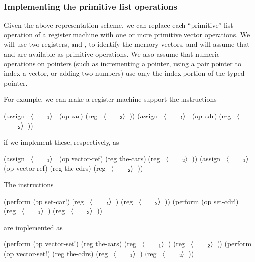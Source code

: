 \subsubsection*{Implementing the primitive list operations}

Given the above representation scheme, we can replace each ``primitive'' list
operation of a register machine with one or more primitive vector operations.
We will use two registers,  and , to identify the
memory vectors, and will assume that  and 
are available as primitive operations.  We also assume that numeric operations
on pointers (such as incrementing a pointer, using a pair pointer to index a
vector, or adding two numbers) use only the index portion of the typed pointer.

For example, we can make a register machine support the instructions

\begin{codeBlock}
(assign ~\(\langle \)~~~~\(_{\mono{1}}\rangle \)~ (op car) (reg ~\(\langle \)~~~~\(_{\mono{2}}\rangle \)~))
(assign ~\(\langle \)~~~~\(_{\mono{1}}\rangle \)~ (op cdr) (reg ~\(\langle \)~~~~\(_{\mono{2}}\rangle \)~))
\end{codeBlock}

\noindent
if we implement these, respectively, as

\begin{codeBlock}
(assign ~\(\langle \)~~~~\(_{\mono{1}}\rangle \)~
        (op vector-ref)
        (reg the-cars)
        (reg ~\(\langle \)~~~~\(_{\mono{2}}\rangle \)~))
(assign ~\(\langle \)~~~~\(_{\mono{1}}\rangle \)~
        (op vector-ref)
        (reg the-cdrs)
        (reg ~\(\langle \)~~~~\(_{\mono{2}}\rangle \)~))
\end{codeBlock}

\noindent
The instructions

\begin{codeBlock}
(perform (op set-car!) (reg ~\(\langle \)~~~~\(_{\mono{1}}\rangle \)~) (reg ~\(\langle \)~~~~\(_{\mono{2}}\rangle \)~))
(perform (op set-cdr!) (reg ~\(\langle \)~~~~\(_{\mono{1}}\rangle \)~) (reg ~\(\langle \)~~~~\(_{\mono{2}}\rangle \)~))
\end{codeBlock}

\noindent
are implemented as

\begin{codeBlock}
(perform (op vector-set!)
         (reg the-cars)
         (reg ~\(\langle \)~~~~\(_{\mono{1}}\rangle \)~)
         (reg ~\(\langle \)~~~~\(_{\mono{2}}\rangle \)~))
(perform (op vector-set!)
         (reg the-cdrs)
         (reg ~\(\langle \)~~~~\(_{\mono{1}}\rangle \)~)
         (reg ~\(\langle \)~~~~\(_{\mono{2}}\rangle \)~))
\end{codeBlock}

